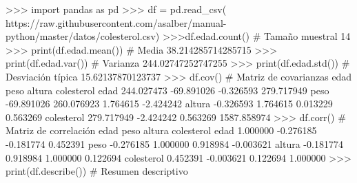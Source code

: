 \documentclass[
  spanish,
  a4paper,
]{scrreport}
\newenvironment{Shaded}{\begin{snugshade}}{\end{snugshade}}
\newcommand{\BuiltInTok}[1]{\textcolor[rgb]{0.00,0.23,0.31}{#1}}
\newcommand{\CommentTok}[1]{\textcolor[rgb]{0.37,0.37,0.37}{#1}}
\newcommand{\DecValTok}[1]{\textcolor[rgb]{0.68,0.00,0.00}{#1}}
\newcommand{\FloatTok}[1]{\textcolor[rgb]{0.68,0.00,0.00}{#1}}
\newcommand{\ImportTok}[1]{\textcolor[rgb]{0.00,0.46,0.62}{#1}}
\newcommand{\NormalTok}[1]{\textcolor[rgb]{0.00,0.23,0.31}{#1}}
\newcommand{\OperatorTok}[1]{\textcolor[rgb]{0.37,0.37,0.37}{#1}}
\newcommand{\StringTok}[1]{\textcolor[rgb]{0.13,0.47,0.30}{#1}}
\begin{document}
\begin{Shaded}
\begin{Highlighting}[]
\OperatorTok{\textgreater{}\textgreater{}\textgreater{}} \ImportTok{import}\NormalTok{ pandas }\ImportTok{as}\NormalTok{ pd}
\OperatorTok{\textgreater{}\textgreater{}\textgreater{}}\NormalTok{ df }\OperatorTok{=}\NormalTok{ pd.read\_csv(}
\StringTok{\textquotesingle{}https://raw.githubusercontent.com/asalber/manual{-}python/master/datos/colesterol.csv\textquotesingle{}}\NormalTok{)}
\OperatorTok{\textgreater{}\textgreater{}\textgreater{}}\NormalTok{df.edad.count()  }\CommentTok{\# Tamaño muestral}
\DecValTok{14}
\OperatorTok{\textgreater{}\textgreater{}\textgreater{}} \BuiltInTok{print}\NormalTok{(df.edad.mean())  }\CommentTok{\# Media}
\FloatTok{38.214285714285715}
\OperatorTok{\textgreater{}\textgreater{}\textgreater{}} \BuiltInTok{print}\NormalTok{(df.edad.var())  }\CommentTok{\# Varianza}
\FloatTok{244.02747252747255}
\OperatorTok{\textgreater{}\textgreater{}\textgreater{}} \BuiltInTok{print}\NormalTok{(df.edad.std())  }\CommentTok{\# Desviación típica}
\FloatTok{15.62137870123737}
\OperatorTok{\textgreater{}\textgreater{}\textgreater{}}\NormalTok{ df.cov()  }\CommentTok{\# Matriz de covarianzas}
\NormalTok{                  edad        peso    altura   colesterol}
\NormalTok{edad        }\FloatTok{244.027473}  \OperatorTok{{-}}\FloatTok{69.891026} \OperatorTok{{-}}\FloatTok{0.326593}   \FloatTok{279.717949}
\NormalTok{peso        }\OperatorTok{{-}}\FloatTok{69.891026}  \FloatTok{260.076923}  \FloatTok{1.764615}    \OperatorTok{{-}}\FloatTok{2.424242}
\NormalTok{altura       }\OperatorTok{{-}}\FloatTok{0.326593}    \FloatTok{1.764615}  \FloatTok{0.013229}     \FloatTok{0.563269}
\NormalTok{colesterol  }\FloatTok{279.717949}   \OperatorTok{{-}}\FloatTok{2.424242}  \FloatTok{0.563269}  \FloatTok{1587.858974}
\OperatorTok{\textgreater{}\textgreater{}\textgreater{}}\NormalTok{ df.corr()  }\CommentTok{\# Matriz de correlación}
\NormalTok{                edad      peso    altura  colesterol}
\NormalTok{edad        }\FloatTok{1.000000} \OperatorTok{{-}}\FloatTok{0.276185} \OperatorTok{{-}}\FloatTok{0.181774}    \FloatTok{0.452391}
\NormalTok{peso       }\OperatorTok{{-}}\FloatTok{0.276185}  \FloatTok{1.000000}  \FloatTok{0.918984}   \OperatorTok{{-}}\FloatTok{0.003621}
\NormalTok{altura     }\OperatorTok{{-}}\FloatTok{0.181774}  \FloatTok{0.918984}  \FloatTok{1.000000}    \FloatTok{0.122694}
\NormalTok{colesterol  }\FloatTok{0.452391} \OperatorTok{{-}}\FloatTok{0.003621}  \FloatTok{0.122694}    \FloatTok{1.000000}
\OperatorTok{\textgreater{}\textgreater{}\textgreater{}} \BuiltInTok{print}\NormalTok{(df.describe())  }\CommentTok{\# Resumen descriptivo}

\end{Highlighting}
\end{Shaded}
\end{document}

